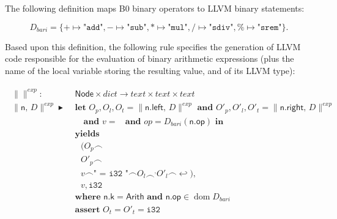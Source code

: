\documentclass{article}
\newcommand{\trad}[2]{\ensuremath{\lVert \textsf{#1} \rVert^{\textit{#2}}}}
\newcommand{\nl}[0]{\ensuremath{\hookleftarrow}}
\DeclareMathOperator{\conc}{\smallfrown}
\DeclareMathOperator{\isdef}{\blacktriangleright}
\DeclareMathOperator{\dom}{\mbox{dom}}
\DeclareMathOperator{\name}{\mathcal{L}()}
\begin{document}
The following definition maps B0 binary operators to LLVM binary statements:

$$D_{bari} = \{ + \mapsto \texttt{"add"}, 
- \mapsto \texttt{"sub"}, * \mapsto \texttt{"mul"}, / \mapsto
\texttt{"sdiv"}, \% \mapsto \texttt{"srem"} \}.$$

Based upon this definition, the following rule specifies the
generation of LLVM code responsible for the evaluation of binary
arithmetic expressions (plus the name of the local variable storing
the resulting value, and of its LLVM type):
\begin{framed}
\begin{align}
\begin{split}
  \trad{}{exp} : & \textsf{ Node} \times dict  \rightarrow text \times text \times  text\\
  \trad{n, $D$}{exp} \isdef & \textbf{ let } O_p, O_l, O_t =
  \trad{n.left, $D$}{exp} \textbf{ and }
  O'_p, O'_l, O'_t = \trad{n.right, $D$}{exp} \\
  & \quad \textbf{ and } v = \name \textbf{ and } op = D_{bari}(\textsf{n.op}) \textbf{ in } \\
  & \textbf{ yields} \\
  & \quad (O_p \conc \\
  & \quad O'_p \conc \\
  & \quad v \conc \texttt{" = i32 "} \conc O_l \conc^, O'_l \conc \nl), \\
  & \quad v, \texttt{i32} \\
  & \textbf{ where } \textsf{n.k} = \textsf{Arith} \textbf{ and } \textsf{n.op} \in \dom D_{bari} \\
  & \textbf{ assert } O_t = O'_t = \texttt{i32}
\end{split}
\end{align}
\end{framed}
\end{document}
